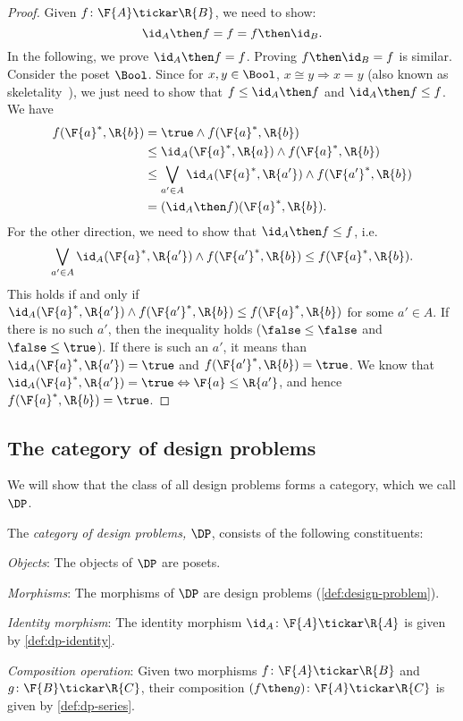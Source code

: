 \begin{proof}
Given $f\colon \F{A}\tickar \R{B}$, we need to show:
\begin{equation}
    \id_A \then f= f = f\then \id_B.
\end{equation}
In the following, we prove $\id_A \then f = f$. Proving $f\then \id_B=f$ is similar.
Consider the poset $\Bool$. Since for $x,y\in \Bool$, $x\cong y \Rightarrow x=y$ (also known as skeletality~\cite{fong2019}), we just need to show that $f\leq \id_A\then f$ and $\id_A\then f\leq f$.
We have
\begin{equation}
\begin{aligned}
        f(\F{a}^*,\R{b})&=\true \wedge f(\F{a}^*,\R{b})\\
        &\leq \id_A(\F{a}^*,\R{a}) \wedge f(\F{a}^*,\R{b})\\
        &\leq \bigvee_{a'\in A}\id_A(\F{a}^*,\R{a'})\wedge f(\F{a'}^*,\R{b})\\
        &=(\id_A\then f)(\F{a}^*,\R{b}).
\end{aligned}
\end{equation}
For the other direction, we need to show that $\id_A\then f\leq f$, i.e.
\begin{equation}
    \bigvee_{a'\in A}\id_A(\F{a}^*,\R{a'})\wedge f(\F{a'}^*,\R{b}) \leq f(\F{a}^*,\R{b}).
\end{equation}
This holds if and only if $\id_A(\F{a}^*,\R{a'})\wedge f(\F{a'}^*,\R{b}) \leq f(\F{a}^*,\R{b})$ for some $a'\in A$. If there is no such $a'$, then the inequality holds ($\false \leq \false$ and $\false \leq \true$). If there is such an $a'$, it means than $\id_A(\F{a}^*,\R{a'})=\true$ and $f(\F{a'}^*,\R{b})=\true$. We know that $\id_A(\F{a}^*,\R{a'})=\true \Leftrightarrow \F{a}\leq \R{a'}$, and hence $f(\F{a}^*,\R{b})=\true$.
\end{proof}

\subsection{The category of design problems}

We will show that the class of all design problems forms a category, which we call $\DP$.

\begin{definition}[Category $\DP$]
\label{define:DP}
The \emph{category of design problems, $\DP$}, consists of the following constituents:
%
\begin{compactenum}
\item \emph{Objects}: The objects of $\DP$ are posets.
\item \emph{Morphisms}: The morphisms of $\DP$ are design problems (\cref{def:design-problem}).
\item \emph{Identity morphism}: The identity morphism $\id_A \colon \F{A} \tickar \R{A}$ is given by \cref{def:dp-identity}.
\item \emph{Composition operation}: Given two morphisms $f \colon  \F{A} \tickar \R{B}$ and $g \colon \F{B} \tickar \R{C}$, their
composition $(f\then g)\colon  \F{A} \tickar \R{C}$ is
given by \cref{def:dp-series}.
\end{compactenum}
\end{definition}

